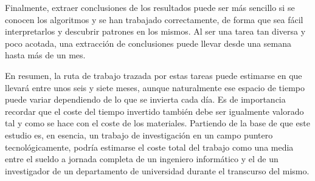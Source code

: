 Finalmente, extraer conclusiones de los resultados puede ser más sencillo si se conocen los algoritmos y se han trabajado correctamente, de forma que sea fácil interpretarlos y descubrir patrones en los mismos. Al ser una tarea tan diversa y poco acotada, una extracción de conclusiones puede llevar desde una semana hasta más de un mes.

En resumen, la ruta de trabajo trazada por estas tareas puede estimarse en que llevará entre unos seis y siete meses, aunque naturalmente ese espacio de tiempo puede variar dependiendo de lo que se invierta cada día. Es de importancia recordar que el coste del tiempo invertido también debe ser igualmente valorado tal y como se hace con el coste de los materiales. Partiendo de la base de que este estudio es, en esencia, un trabajo de investigación en un campo puntero tecnológicamente, podría estimarse el coste total del trabajo como una media entre el sueldo a jornada completa de un ingeniero informático y el de un investigador de un departamento de universidad durante el transcurso del mismo.